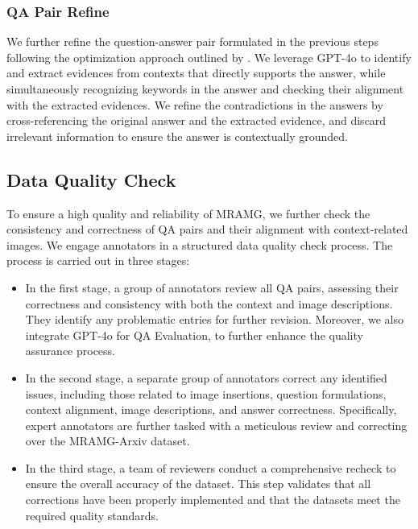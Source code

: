 \subsubsection{QA Pair Refine}
We further refine the question-answer pair formulated in the previous steps following the optimization approach outlined by \citet{zhu2024rageval}.
We leverage GPT-4o to identify and extract evidences from contexts that directly supports the answer, while simultaneously recognizing keywords in the answer and checking their alignment with the extracted evidences. We refine the contradictions in the answers by cross-referencing the original answer and the extracted evidence, and discard irrelevant information to ensure the answer is contextually grounded.

\subsection{Data Quality Check}

To ensure a high quality and reliability of MRAMG, we further check the consistency and correctness of QA pairs and their alignment with context-related images. We engage annotators in a structured data quality check process.
The process is carried out in three stages:
\begin{itemize}
    \item In the first stage, a group of annotators review all QA pairs, assessing their correctness and consistency with both the context and image descriptions. They identify any problematic entries for further revision. Moreover, we also integrate GPT-4o for QA Evaluation, to further enhance the quality assurance process.
    \item In the second stage, a separate group of annotators correct any identified issues, including those related to image insertions, question formulations, context alignment, image descriptions, and answer correctness. Specifically, expert annotators are further tasked with a meticulous review and correcting over the MRAMG-Arxiv dataset.
    \item In the third stage, a team of 
    reviewers conduct a comprehensive recheck to ensure the overall accuracy of the dataset. This step validates that all corrections have been properly implemented and that the datasets meet the required quality standards.
\end{itemize}

